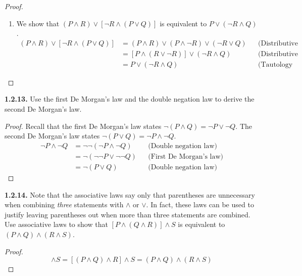 \documentclass[12pt]{amsart}
\newenvironment{statement}[1]{\smallskip\noindent\color[rgb]{.6627, .3529, .6314} {\bf #1.}}{}
\theoremstyle{definition}
\theoremstyle{remark}
\begin{document}
\begin{proof}
\begin{enumerate}
	\item We show that $(P \wedge R) \vee [\neg R \wedge (P \vee Q)]$ is equivalent to $P \vee (\neg R \wedge Q)$.
	\begin{align*}
		(P \wedge R) \vee [\neg R \wedge (P \vee Q)]
		&= (P \wedge R) \vee (P \wedge \neg R) \vee (\neg R \vee Q)
		&& \text{(Distributive law)} \\
		&= [P \wedge (R \vee \neg R)] \vee (\neg R \wedge Q) && \text{(Distributive law)} \\
		&= P \vee (\neg R \wedge Q) && \text{(Tautology law)}
	\end{align*}
\end{enumerate}
\end{proof}


\begin{statement}{1.2.13}
Use the first De Morgan's law and the double negation law to derive the second De Morgan's law.
\end{statement}

\begin{proof}
Recall that the first De Morgan's law states $\neg (P \wedge Q) = \neg P \vee \neg Q$.
The second De Morgan's law states $\neg (P \vee Q) = \neg P \wedge \neg Q$.
\begin{align*}
	\neg P \wedge \neg Q
	&= \neg \neg (\neg P \wedge \neg Q) && \text{(Double negation law)} \\
	&= \neg (\neg \neg P \vee \neg \neg Q) && \text{(First De Morgan's law)} \\
	&= \neg (P \vee Q) && \text{(Double negation law)}
\end{align*}
\end{proof}


\begin{statement}{1.2.14}
Note that the associative laws say only that parentheses are unnecessary when combining \emph{three} statements with $\wedge$ or $\vee$.
In fact, these laws can be used to justify leaving parentheses out when more than three statements are combined.
Use associative laws to show that $[P \wedge (Q \wedge R)] \wedge S$ is equivalent to $(P \wedge Q) \wedge (R \wedge S)$.
\end{statement}

\begin{proof}
\begin{equation*}
	[P \wedge (Q \wedge R)] \wedge S
	= [(P \wedge Q) \wedge R] \wedge S
	= (P \wedge Q) \wedge (R \wedge S)
\end{equation*}
\end{proof}
\end{document}
